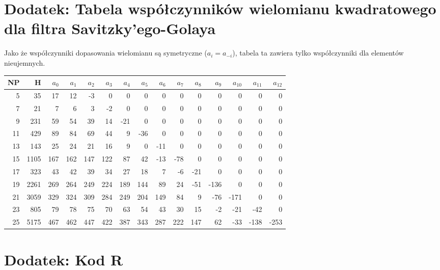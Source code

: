 \documentclass[polish, twoside, 12pt, a4paper]{article}
\theoremstyle{definition}
\theoremstyle{plain}
\theoremstyle{remark}
\begin{document}
\section{Dodatek: Tabela współczynników wielomianu kwadratowego dla filtra Savitzky'ego-Golaya}
Jako że współczynniki dopasowania wielomianu są symetryczne (\(a_{i}=a_{-i}\)), tabela ta zawiera tylko współczynniki dla elementów nieujemnych. \\
\begin{table}[h]
\begin{tabular}{rrrrrrrrrrrrrrr}
NP & H & \(a_{0}\) & \(a_{1}\) & \(a_{2}\) & \(a_{3}\) & \(a_{4}\) & \(a_{5}\) & \(a_{6}\) & \(a_{7}\) & \(a_{8}\) & \(a_{9}\) & \(a_{10}\) & \(a_{11}\) & \(a_{12}\)  \\ \hline
5 & 35 & 17 & 12 & -3 & 0 & 0 & 0 & 0 & 0 & 0 & 0 & 0 & 0 & 0 \\
7 & 21 & 7 & 6 & 3 & -2 & 0 & 0 & 0 & 0 & 0 & 0 & 0 & 0 & 0 \\
9 & 231 & 59 & 54 & 39 & 14 & -21 & 0 & 0 & 0 & 0 & 0 & 0 & 0 & 0 \\
11 & 429 & 89 & 84 & 69 & 44 & 9 & -36 & 0 & 0 & 0 & 0 & 0 & 0 & 0 \\
13 & 143 & 25 & 24 & 21 & 16 & 9 & 0 & -11 & 0 & 0 & 0 & 0 & 0 & 0 \\
15 & 1105 & 167 & 162 & 147 & 122 & 87 & 42 & -13 & -78 & 0 & 0 & 0 & 0 & 0 \\
17 & 323 & 43 & 42 & 39 & 34 & 27 & 18 & 7 & -6 & -21 & 0 & 0 & 0 & 0 \\
19 & 2261 & 269 & 264 & 249 & 224 & 189 & 144 & 89 & 24 & -51 & -136 & 0 & 0 & 0 \\
21 & 3059 & 329 & 324 & 309 & 284 & 249 & 204 & 149 & 84 & 9 & -76 & -171 & 0 & 0 \\
23 & 805 & 79 & 78 & 75 & 70 & 63 & 54 & 43 & 30 & 15 & -2 & -21 & -42 & 0 \\
25 & 5175 & 467 & 462 & 447 & 422 & 387 & 343 & 287 & 222 & 147 & 62 & -33 & -138 & -253 
\end{tabular}
\end{table}

\clearpage
\section{Dodatek: Kod R}




\clearpage


\end{document}
